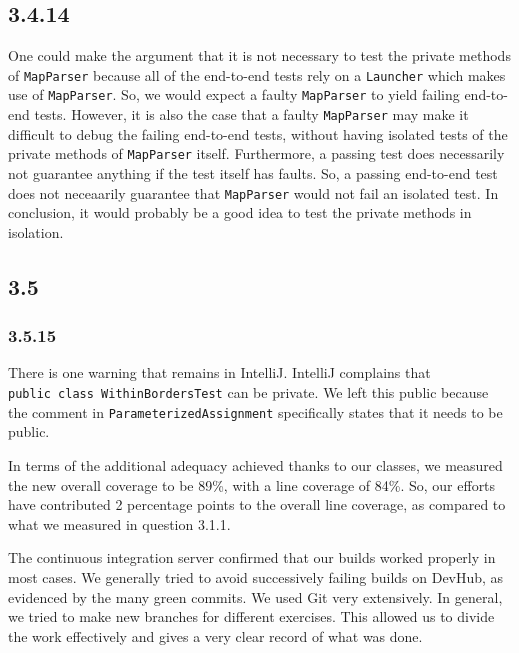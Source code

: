 \documentclass[]{article}
\begin{document}
\subsection{3.4.14}\label{section-9}

One could make the argument that it is not necessary to test the private
methods of \texttt{MapParser} because all of the end-to-end tests rely
on a \texttt{Launcher} which makes use of \texttt{MapParser}. So, we
would expect a faulty \texttt{MapParser} to yield failing end-to-end
tests. However, it is also the case that a faulty \texttt{MapParser} may
make it difficult to debug the failing end-to-end tests, without having
isolated tests of the private methods of \texttt{MapParser} itself.
Furthermore, a passing test does necessarily not guarantee anything if
the test itself has faults. So, a passing end-to-end test does not
neceaarily guarantee that \texttt{MapParser} would not fail an isolated
test. In conclusion, it would probably be a good idea to test the
private methods in isolation.

\subsection{3.5}\label{section-10}

\subsubsection{3.5.15}\label{section-11}

There is one warning that remains in IntelliJ. IntelliJ complains that
\texttt{public\ class\ WithinBordersTest} can be private. We left this
public because the comment in \texttt{ParameterizedAssignment}
specifically states that it needs to be public.

In terms of the additional adequacy achieved thanks to our classes, we
measured the new overall coverage to be 89\%, with a line coverage of
84\%. So, our efforts have contributed 2 percentage points to the
overall line coverage, as compared to what we measured in question
3.1.1.

The continuous integration server confirmed that our builds worked
properly in most cases. We generally tried to avoid successively failing
builds on DevHub, as evidenced by the many green commits. We used Git
very extensively. In general, we tried to make new branches for
different exercises. This allowed us to divide the work effectively and
gives a very clear record of what was done.
\end{document}
